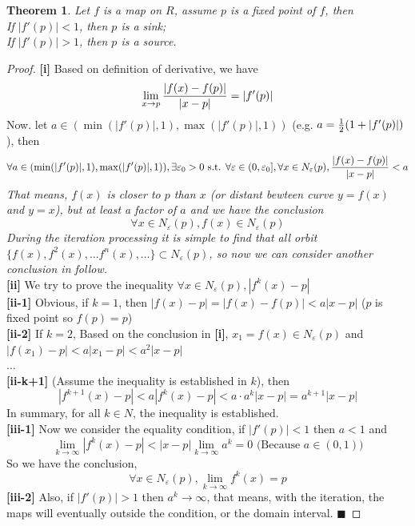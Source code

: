 \documentclass[12pt]{article}
\theoremstyle{plain}
\newtheorem{theorem}{\textbf{Theorem}}[section]
\newtheorem{proof}{\textit{PROOF}}[section]
\begin{document}
\begin{theorem} \label{sink-source-point}Let $f$ is a map on $R$, assume $p$ is a fixed point of $f$, then
\\\noindent [i] If $|f'(p)| < 1$, then $p$ is a sink;
\\\noindent [ii] If $|f'(p)| > 1$, then $p$ is a source.
\end{theorem}


{\color{blue}
\begin{proof} \textbf{[i]} Based on definition of derivative, we have
$$
\lim_{x \rightarrow p} {|f(x) - f(p)| \over |x - p|} = |f'(p)|
$$
Now. let $a \in (\min(|f'(p)|, 1), \max(|f'(p)|, 1))$ (e.g. $a = {1\over 2}(1+ |f'(p)|)$), then
$$
\forall a \in (\min(|f'(p)|, 1), \max(|f'(p)|, 1)), \exists \varepsilon_0 > 0 \text{ s.t. } \forall \varepsilon \in (0, \varepsilon_0], \forall x \in N_\varepsilon(p), {|f(x) - f(p)| \over |x - p|} < a
$$
            \textit{That means, $f(x)$ is closer to $p$ than $x$ (or distant bewteen curve $y = f(x)$ and $y = x$), but at least a factor of $a$ and we have the conclusion
$$
\forall x \in N_\varepsilon(p), f(x) \in N_\varepsilon(p)
$$
            During the iteration processing it is simple to find that all orbit $\{f(x), f^2(x), \ldots f^n(x), \ldots\} \subset N_\varepsilon(p)$, so now we can consider another conclusion in follow.}
\\[2ex]\noindent \textbf{[ii]} We try to prove the inequality $\forall x \in N_\varepsilon(p), |f^k(x) - p|$
\\\noindent \textbf{[ii-1]} Obvious, if $k = 1$, then $|f(x) - p| = |f(x) - f(p)| < a |x-p|$ ($p$ is fixed point so $f(p) = p$)
\\\noindent \textbf{[ii-2]} If $k = 2$, Based on the conclusion in \textbf{[i]}, $x_1 = f(x) \in N_\varepsilon(p)$ and $|f(x_1) - p| < a |x_1 - p| < a^2 |x - p|$
\\\noindent $\ldots$
\\\noindent \textbf{[ii-k+1]} (Assume the inequality is established in $k$), then
$$
|f^{k+1}(x) - p| < a|f^k(x) - p| < a \cdot a^k |x - p| = a^{k+1}|x - p|
$$
            In summary, for all $k \in N$, the inequality is established.
\\[2ex]\noindent \textbf{[iii-1]} Now we consider the equality condition, if $|f'(p)| < 1$ then $a < 1$ and  
$$
\lim_{k \rightarrow \infty}|f^{k}(x) - p| < |x-p|\lim_{k \rightarrow \infty} a^k = 0 \text{ (Because }a \in (0, 1)\text{)} 
$$
            So we have the conclusion, 
$$
\forall x \in N_\varepsilon(p), \lim_{k \rightarrow \infty}f^k(x) = p
$$
            \textbf{[iii-2]} Also, if $|f'(p)| > 1$ then $a^k \rightarrow \infty$, that means, with the iteration, the maps will eventually outside the condition, or the domain interval. $\blacksquare$
\end{proof}
}
\end{document}
